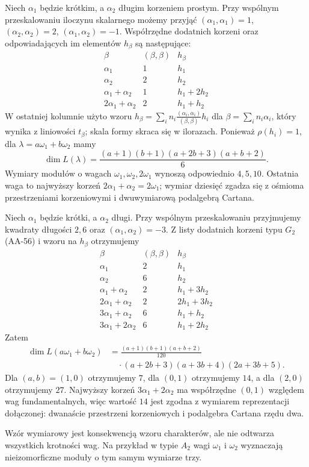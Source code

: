 \begin{przyklad}[Typ $B_2$]
\label{aa:prz:weyl-dimension-b2}
Niech $\alpha_1$ będzie krótkim, a $\alpha_2$ długim korzeniem prostym. Przy wspólnym przeskalowaniu iloczynu skalarnego możemy przyjąć $(\alpha_1,\alpha_1)=1$, $(\alpha_2,\alpha_2)=2$, $(\alpha_1,\alpha_2)=-1$. Współrzędne dodatnich korzeni oraz odpowiadających im elementów $h_\beta$ są następujące:
\[
 \begin{array}{c|c|c}
 \beta & (\beta,\beta)&h_\beta\\ \hline
 \alpha_1&1&h_1\\
 \alpha_2&2&h_2\\
 \alpha_1+\alpha_2&1&h_1+2h_2\\
 2\alpha_1+\alpha_2&2&h_1+h_2
 \end{array}
\]
W ostatniej kolumnie użyto wzoru
$h_\beta=\sum_i n_i\frac{(\alpha_i,\alpha_i)}{(\beta,\beta)}h_i$
dla $\beta=\sum_i n_i\alpha_i$, który wynika z liniowości $t_\beta$; skala formy skraca się w ilorazach. Ponieważ $\rho(h_i)=1$, dla $\lambda=a\omega_1+b\omega_2$ mamy
\[
 \dim L(\lambda)=
 \frac{(a+1)(b+1)(a+2b+3)(a+b+2)}{6}.
\]
Wymiary modułów o wagach $\omega_1,\omega_2,2\omega_1$ wynoszą odpowiednio $4,5,10$. Ostatnia waga to najwyższy korzeń $2\alpha_1+\alpha_2=2\omega_1$; wymiar dziesięć zgadza się z ośmioma przestrzeniami korzeniowymi i dwuwymiarową podalgebrą Cartana.
\end{przyklad}

\begin{przyklad}
\label{aa:prz:weyl-dimension-g2}
Niech $\alpha_1$ będzie krótki, a $\alpha_2$ długi. Przy wspólnym przeskalowaniu przyjmujemy kwadraty długości $2,6$ oraz $(\alpha_1,\alpha_2)=-3$. Z listy dodatnich korzeni typu $G_2$ (AA-56) i wzoru na $h_\beta$ otrzymujemy
\[
 \begin{array}{c|c|c}
 \beta&(\beta,\beta)&h_\beta\\ \hline
 \alpha_1&2&h_1\\
 \alpha_2&6&h_2\\
 \alpha_1+\alpha_2&2&h_1+3h_2\\
 2\alpha_1+\alpha_2&2&2h_1+3h_2\\
 3\alpha_1+\alpha_2&6&h_1+h_2\\
 3\alpha_1+2\alpha_2&6&h_1+2h_2
 \end{array}
\]
Zatem
\[
 \begin{aligned}
 \dim L(a\omega_1+b\omega_2)
 &=\frac{(a+1)(b+1)(a+b+2)}{120}\\
 &\quad\cdot(a+2b+3)(a+3b+4)(2a+3b+5).
 \end{aligned}
\]
Dla $(a,b)=(1,0)$ otrzymujemy $7$, dla $(0,1)$ otrzymujemy $14$, a dla $(2,0)$ otrzymujemy $27$. Najwyższy korzeń $3\alpha_1+2\alpha_2$ ma współrzędne $(0,1)$ względem wag fundamentalnych, więc wartość $14$ jest zgodna z wymiarem reprezentacji dołączonej: dwanaście przestrzeni korzeniowych i podalgebra Cartana rzędu dwa.
\end{przyklad}

Wzór wymiarowy jest konsekwencją wzoru charakterów, ale nie odtwarza wszystkich krotności wag. Na przykład w typie $A_2$ wagi $\omega_1$ i $\omega_2$ wyznaczają nieizomorficzne moduły o tym samym wymiarze trzy.
